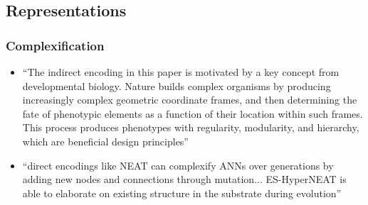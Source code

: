 

\subsection{Representations}

\subsubsection{Complexification}
  \begin{itemize}
    \item ``The indirect encoding in this paper is motivated by a key concept from developmental biology. Nature builds complex organisms by producing increasingly complex geometric coordinate frames, and then determining the fate of phenotypic elements as a function of their location within such frames. This process produces phenotypes with regularity, modularity, and hierarchy, which are beneficial design principles'' \cite{Clune2011OnRegularity}
    \item ``direct encodings like NEAT can complexify ANNs over generations by adding new nodes and connections through mutation... ES-HyperNEAT is able to elaborate on existing structure in the substrate during evolution'' \cite{Risi2010EvolvingSubstrate}
  \end{itemize}

